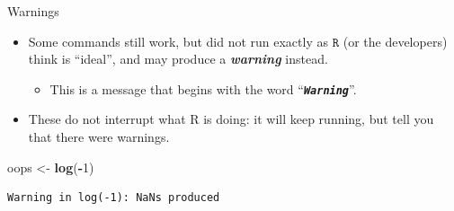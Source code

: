\documentclass[
  11pt,
  ignorenonframetext,
]{beamer}
\newcommand{\VERB}{\Verb[commandchars=\\\{\}]}
\newenvironment{Shaded}{\begin{snugshade}}{\end{snugshade}}
\newcommand{\DecValTok}[1]{\textcolor[rgb]{0.00,0.00,0.81}{#1}}
\newcommand{\FunctionTok}[1]{\textcolor[rgb]{0.13,0.29,0.53}{\textbf{#1}}}
\newcommand{\NormalTok}[1]{#1}
\newcommand{\OtherTok}[1]{\textcolor[rgb]{0.56,0.35,0.01}{#1}}
\newcommand{\SpecialCharTok}[1]{\textcolor[rgb]{0.81,0.36,0.00}{\textbf{#1}}}
\newcommand{\WarningTok}[1]{\textcolor[rgb]{0.56,0.35,0.01}{\textbf{\textit{#1}}}}
\providecommand{\tightlist}{%
  \setlength{\itemsep}{0pt}\setlength{\parskip}{0pt}}
\begin{document}
\begin{frame}[fragile]{Warnings}
\protect\hypertarget{warnings}{}
\begin{itemize}
\tightlist
\item
  Some commands still work, but did not run exactly as \(\texttt{R}\)
  (or the developers) think is ``ideal'', and may produce a
  \textbf{\emph{warning}} instead.

  \begin{itemize}
  \tightlist
  \item
    This is a message that begins with the word
    ``\WarningTok{\texttt{Warning}}''.
  \end{itemize}
\item
  These do not interrupt what R is doing: it will keep running, but tell
  you that there were warnings.

\end{itemize}

\begin{Shaded}
\begin{Highlighting}[]
\NormalTok{oops }\OtherTok{\textless{}{-}} \FunctionTok{log}\NormalTok{(}\SpecialCharTok{{-}}\DecValTok{1}\NormalTok{)}
\end{Highlighting}
\end{Shaded}

\begin{verbatim}
Warning in log(-1): NaNs produced
\end{verbatim}
\end{frame}
\end{document}
